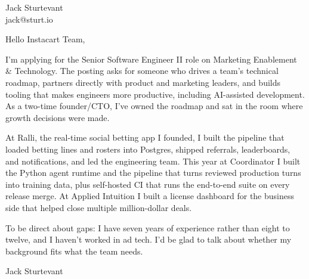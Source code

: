 \documentclass[11pt]{article}
\begin{document}
\raggedright

{\namefont\fontsize{20pt}{24pt}\selectfont Jack Sturtevant}\\[-0.3em]
jack@sturt.io

\vspace{1.2em}

Hello Instacart Team,

I'm applying for the Senior Software Engineer II role on Marketing Enablement \& Technology. The posting asks for someone who drives a team's technical roadmap, partners directly with product and marketing leaders, and builds tooling that makes engineers more productive, including AI-assisted development. As a two-time founder/CTO, I've owned the roadmap and sat in the room where growth decisions were made.

At Ralli, the real-time social betting app I founded, I built the pipeline that loaded betting lines and rosters into Postgres, shipped referrals, leaderboards, and notifications, and led the engineering team. This year at Coordinator I built the Python agent runtime and the pipeline that turns reviewed production turns into training data, plus self-hosted CI that runs the end-to-end suite on every release merge. At Applied Intuition I built a license dashboard for the business side that helped close multiple million-dollar deals.

To be direct about gaps: I have seven years of experience rather than eight to twelve, and I haven't worked in ad tech. I'd be glad to talk about whether my background fits what the team needs.

\vspace{0.6em}
Jack Sturtevant
\end{document}
